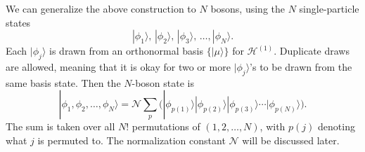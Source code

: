 \documentclass[prx,12pt]{revtex4-2}
\begin{document}
We can generalize the above construction to $N$ bosons, using the $N$
single-particle states
\begin{equation}
  |\phi_1\rangle, \, |\phi_2\rangle, \, |\phi_3\rangle, \, \dots, |\phi_N\rangle.
\end{equation}
Each $|\phi_j\rangle$ is drawn from an orthonormal basis
$\{|\mu\rangle\}$ for $\mathscr{H}^{(1)}$.  Duplicate draws are
allowed, meaning that it is okay for two or more $|\phi_j\rangle$'s to
be drawn from the same basis state.  Then the $N$-boson state is
\begin{equation}
  |\phi_1,\phi_2,\dots,\phi_N\rangle = \mathcal{N} \sum_p
  \Big(|\phi_{p(1)}\rangle  |\phi_{p(2)}\rangle  |\phi_{p(3)}\rangle  \cdots
  |\phi_{p(N)}\rangle\Big).
  \label{nbosons}
\end{equation}
The sum is taken over all $N!$ permutations of $(1,2,\dots,N)$, with
$p(j)$ denoting what $j$ is permuted to.  The normalization constant
$\mathcal{N}$ will be discussed later.
\end{document}
